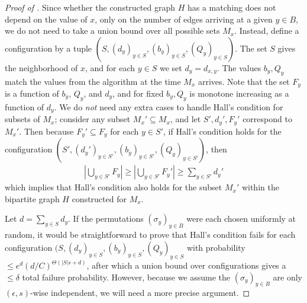 \documentclass[10pt]{article}
\theoremstyle{definition}\newtheorem{definition}[lemma]{Definition}
\theoremstyle{remark}  \newtheorem*{remark}{Remark}
\begin{document}
\begin{proof}[Proof of ]
  Since whether the constructed graph $H$ has a matching does not depend on the value of $x$, only on the number of edges arriving at a given $y \in B$, we do not need to take a union bound over all possible sets $M_x$. Instead, define a configuration by a tuple $(S,(d_y)_{y \in S},(b_y)_{y \in S},(Q_y)_{y \in S})$. The set $S$ gives the neighborhood of $x$, and for each $y \in S$ we set $d_y = d_{x,y}$. The values $b_y,Q_y$ match the values from the algorithm at the time $M_x$ arrives. Note that the set $F_y$ is a function of $b_y$, $Q_y$, and $d_y$, and for fixed $b_y,Q_y$ is monotone increasing as a function of $d_y$. We do \emph{not} need any extra cases to handle Hall's condition for subsets of $M_x$; consider any subset $M_x' \subseteq M_x$, and let $S',d_{y}',F_y'$ correspond to $M_x'$. Then because $F_y' \subseteq F_y$ for each $y \in S'$, if Hall's condition holds for the configuration $(S',(d_y')_{y \in S'},(b_y)_{y \in S'},(Q_y)_{y \in S'})$, then
  \begin{align*}
    \left|\bigcup_{y \in S'} F_{y}\right| \ge \left|\bigcup_{y \in S'} F_{y}'\right| \ge \sum_{y \in S'} d_y'
  \end{align*}
  which implies that Hall's condition also holds for the subset $M_x'$ within the bipartite graph $H$ constructed for $M_x$.
  
  
  
  Let $d = \sum_{y \in S} d_y$. If the permutations $(\sigma_y)_{y\in B}$ were each chosen uniformly at random, it would be straightforward to prove that Hall's condition fails for each configuration $(S,(d_y)_{y \in S},(b_y)_{y \in S},(Q_y)_{y \in S}$ with probability $\le e^d (d/C)^{\Theta(|S| s + d)}$, after which a union bound over configurations gives a $\le \delta$ total failure probability. However, because we assume the $(\sigma_y)_{y\in B}$ are only $(\epsilon,s)$-wise independent, we will need a more precise argument.
  

\end{proof}
\end{document}
